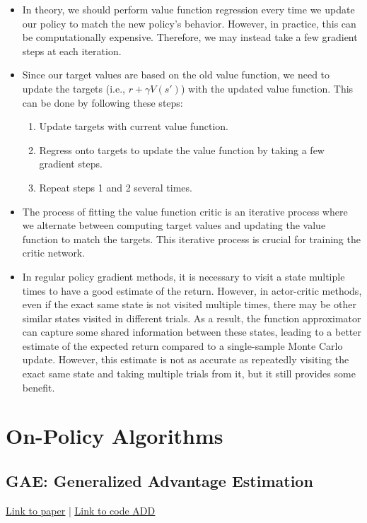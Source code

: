 \documentclass{article}
\begin{document}
\begin{itemize}
\item In theory, we should perform value function regression every time we update our policy to match the new policy's behavior. However, in practice, this can be computationally expensive. Therefore, we may instead take a few gradient steps at each iteration.
\item Since our target values are based on the old value function, we need to update the targets (i.e., $r + \gamma V(s')$) with the updated value function. This can be done by following these steps:
\begin{enumerate}
\item Update targets with current value function.
\item Regress onto targets to update the value function by taking a few gradient steps.
\item Repeat steps 1 and 2 several times.
\end{enumerate}
\item The process of fitting the value function critic is an iterative process where we alternate between computing target values and updating the value function to match the targets. This iterative process is crucial for training the critic network.
\item In regular policy gradient methods, it is necessary to visit a state multiple times to have a good estimate of the return. However, in actor-critic methods, even if the exact same state is not visited multiple times, there may be other similar states visited in different trials. As a result, the function approximator can capture some shared information between these states, leading to a better estimate of the expected return compared to a single-sample Monte Carlo update. However, this estimate is not as accurate as repeatedly visiting the exact same state and taking multiple trials from it, but it still provides some benefit.
\end{itemize}

\newpage

\section{On-Policy Algorithms}
\subsection{GAE: Generalized Advantage Estimation}\label{sec:GAE}
\href{https://arxiv.org/abs/1506.02438}{\underline{Link to paper}} | \href{https://arxiv.org/abs/1506.02438}{\underline{Link to code ADD}} 
\end{document}
